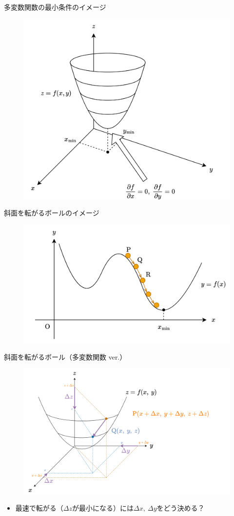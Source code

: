 \documentclass[dvipdfmx,aspectratio=169]{beamer}
\begin{document}
	\begin{frame}{多変数関数の最小条件のイメージ}
		\begin{figure}
			\centering
			\includegraphics[width=0.6\linewidth]{img/image-of-the-parameters-that-take-the-minimum-value-of-multivariable-function}
		\end{figure}
	\end{frame}
	\begin{frame}{斜面を転がるボールのイメージ}
		\begin{figure}
			\centering
			\includegraphics[width=0.7\linewidth]{img/image-of-a-ball-rolling-down-a-slope}
		\end{figure}
	\end{frame}
	\begin{frame}{斜面を転がるボール（多変数関数 ver.）}
		\begin{figure}
			\centering
			\includegraphics[width=0.6\linewidth]{img/change-in-value-of-a-multivariable-function}
		\end{figure}
		\begin{itemize}
			\item 最速で転がる（$ \Delta z $が最小になる）には$ \Delta x,\ \Delta y $をどう決める？
		\end{itemize}
	\end{frame}
\end{document}
